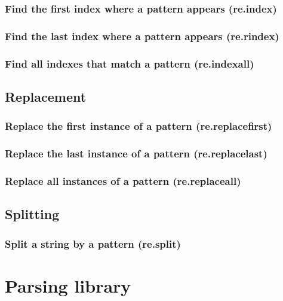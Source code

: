 \documentclass{article}
\theoremstyle{definition}
\begin{document}
\subsubsection{Find the first index where a pattern appears (re.index)}

\subsubsection{Find the last index where a pattern appears (re.rindex)}

\subsubsection{Find all indexes that match a pattern (re.indexall)}

\subsection{Replacement}

\subsubsection{Replace the first instance of a pattern (re.replacefirst)}

\subsubsection{Replace the last instance of a pattern (re.replacelast)}

\subsubsection{Replace all instances of a pattern (re.replaceall)}

\subsection{Splitting}

\subsubsection{Split a string by a pattern (re.split)}

\pagebreak

\section{Parsing library}
\end{document}
